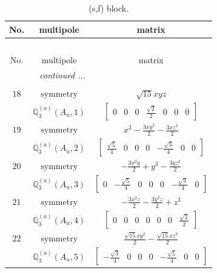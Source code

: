 \documentclass[fleqn,8pt,landscape]{jsarticle}
\begin{document}
\begin{longtable}{ccc}
\caption{(s,f) block.}
 \\
 \hline \hline
No. & multipole & matrix \\ \hline \endfirsthead

\multicolumn{2}{l}{\tablename\ \thetable{}} \\
 \hline \hline
No. & multipole & matrix \\ \hline \endhead

 \hline \hline
\multicolumn{2}{r}{\footnotesize\it continued ...} \\ \endfoot

 \hline \hline
\multicolumn{2}{r}{} \\ \endlastfoot

$ 18 $ & $ \text{symmetry} $ & $ \sqrt{15} x y z $ \\
$  $ & $ \mathbb{Q}_{3}^{(a)}(A_{u},1) $ & $ \begin{bmatrix} 0 & 0 & 0 & \frac{\sqrt{2}}{2} & 0 & 0 & 0 \end{bmatrix} $ \\ \hline
$ 19 $ & $ \text{symmetry} $ & $ x^{3} - \frac{3 x y^{2}}{2} - \frac{3 x z^{2}}{2} $ \\
$  $ & $ \mathbb{Q}_{3}^{(a)}(A_{u},2) $ & $ \begin{bmatrix} \frac{\sqrt{5}}{4} & 0 & 0 & 0 & - \frac{\sqrt{3}}{4} & 0 & 0 \end{bmatrix} $ \\ \hline
$ 20 $ & $ \text{symmetry} $ & $ - \frac{3 x^{2} y}{2} + y^{3} - \frac{3 y z^{2}}{2} $ \\
$  $ & $ \mathbb{Q}_{3}^{(a)}(A_{u},3) $ & $ \begin{bmatrix} 0 & - \frac{\sqrt{5}}{4} & 0 & 0 & 0 & - \frac{\sqrt{3}}{4} & 0 \end{bmatrix} $ \\ \hline
$ 21 $ & $ \text{symmetry} $ & $ - \frac{3 x^{2} z}{2} - \frac{3 y^{2} z}{2} + z^{3} $ \\
$  $ & $ \mathbb{Q}_{3}^{(a)}(A_{u},4) $ & $ \begin{bmatrix} 0 & 0 & 0 & 0 & 0 & 0 & \frac{\sqrt{2}}{2} \end{bmatrix} $ \\ \hline
$ 22 $ & $ \text{symmetry} $ & $ \frac{\sqrt{15} x y^{2}}{2} - \frac{\sqrt{15} x z^{2}}{2} $ \\
$  $ & $ \mathbb{Q}_{3}^{(a)}(A_{u},5) $ & $ \begin{bmatrix} - \frac{\sqrt{3}}{4} & 0 & 0 & 0 & - \frac{\sqrt{5}}{4} & 0 & 0 \end{bmatrix} $ \\ \hline

\end{longtable}
\end{document}
